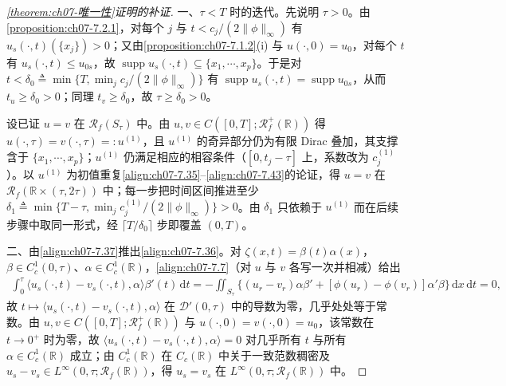 \documentclass[../../main.tex]{subfiles}%
\begin{document}
\begin{proof}[\cref{theorem:ch07-唯一性}证明的补证]
一、$\tau<T$ 时的迭代。先说明 $\tau>0$。由\cref{proposition:ch07-7.2.1}，对每个 $j$ 与 $t<c_j/(2\|\phi\|_\infty)$ 有 $u_s(\cdot,t)(\{x_j\})>0$；又由\cref{proposition:ch07-7.1.2}(i) 与 $u(\cdot,0)=u_0$，对每个 $t$ 有 $u_s(\cdot,t)\leqslant u_{0s}$，故 $\operatorname{supp}u_s(\cdot,t)\subseteq\{x_1,\cdots,x_p\}$。于是对 $t<\delta_0\triangleq\min\{T,\min_jc_j/(2\|\phi\|_\infty)\}$ 有 $\operatorname{supp}u_s(\cdot,t)=\operatorname{supp}u_{0s}$，从而 $t_u\geqslant\delta_0>0$；同理 $t_v\geqslant\delta_0$，故 $\tau\geqslant\delta_0>0$。

设已证 $u=v$ 在 $\mathscr{R}_f(S_\tau)$ 中。由 $u,v\in C([0,T];\mathscr{R}_f^+(\mathbb{R}))$ 得 $u(\cdot,\tau)=v(\cdot,\tau)=:u^{(1)}$，且 $u^{(1)}$ 的奇异部分仍为有限 Dirac 叠加，其支撑含于 $\{x_1,\cdots,x_p\}$；$u^{(1)}$ 仍满足相应的相容条件（$[0,t_j-\tau]$ 上，系数改为 $c_j^{(1)}$）。以 $u^{(1)}$ 为初值重复\eqref{align:ch07-7.35}--\eqref{align:ch07-7.43}的论证，得 $u=v$ 在 $\mathscr{R}_f(\mathbb{R}\times(\tau,2\tau))$ 中；每一步把时间区间推进至少 $\delta_1\triangleq\min\{T-\tau,\min_jc_j^{(1)}/(2\|\phi\|_\infty)\}>0$。由 $\delta_1$ 只依赖于 $u^{(1)}$ 而在后续步骤中取同一形式，经 $\lceil T/\delta_0\rceil$ 步即覆盖 $(0,T)$。

二、由\eqref{align:ch07-7.37}推出\eqref{align:ch07-7.36}。对 $\zeta(x,t)=\beta(t)\alpha(x)$，$\beta\in C^1_c(0,\tau)$、$\alpha\in C^1_c(\mathbb{R})$，\eqref{align:ch07-7.7}（对 $u$ 与 $v$ 各写一次并相减）给出
\begin{align*}
\int_0^\tau\langle u_s(\cdot,t)-v_s(\cdot,t),\alpha\rangle\beta'(t)\,\mathrm{d}t
=-\iint_{S_\tau}\{(u_r-v_r)\alpha\beta'+[\phi(u_r)-\phi(v_r)]\alpha'\beta\}\,\mathrm{d}x\,\mathrm{d}t=0,
\end{align*}
故 $t\mapsto\langle u_s(\cdot,t)-v_s(\cdot,t),\alpha\rangle$ 在 $\mathcal{D}'(0,\tau)$ 中的导数为零，几乎处处等于常数。由 $u,v\in C([0,T];\mathscr{R}_f^+(\mathbb{R}))$ 与 $u(\cdot,0)=v(\cdot,0)=u_0$，该常数在 $t\to0^+$ 时为零，故 $\langle u_s(\cdot,t)-v_s(\cdot,t),\alpha\rangle=0$ 对几乎所有 $t$ 与所有 $\alpha\in C^1_c(\mathbb{R})$ 成立；由 $C^1_c(\mathbb{R})$ 在 $C_c(\mathbb{R})$ 中关于一致范数稠密及 $u_s-v_s\in L^\infty(0,\tau;\mathscr{R}_f(\mathbb{R}))$，得 $u_s=v_s$ 在 $L^\infty(0,\tau;\mathscr{R}_f(\mathbb{R}))$ 中。


\end{proof}
\end{document}
